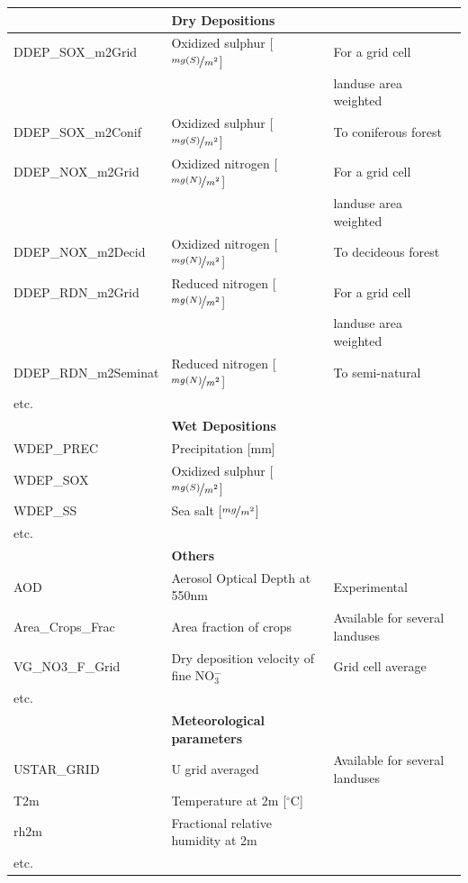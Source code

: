 \documentclass[a4paper,12pt]{report}
\newcommand{\degrees}{\ensuremath{^\circ}}
\newcommand{\tmgSm}{$\nicefrac{mg(S)}{m^{2}}$}
\newcommand{\tmgNm}{$\nicefrac{mg(N)}{m^{2}}$}
\newcommand{\tmgm}{$\nicefrac{mg}{m^{2}}$}
\begin{document}
\begin{center}
\begin{longtable}{lll}
& {\bf Dry Depositions}   & \\
\hline
    DDEP\_SOX\_m2Grid & Oxidized sulphur [\tmgSm]& For a grid cell\\
    & & landuse area weighted \\
    DDEP\_SOX\_m2Conif & Oxidized sulphur [\tmgSm]& To coniferous
    forest \\
    DDEP\_NOX\_m2Grid & Oxidized nitrogen [\tmgNm]& For a grid cell\\
    & & landuse area weighted \\
    DDEP\_NOX\_m2Decid & Oxidized nitrogen [\tmgNm]& To decideous
    forest \\
    DDEP\_RDN\_m2Grid & Reduced nitrogen [\tmgNm]& For a grid cell\\
    & & landuse area weighted \\
    DDEP\_RDN\_m2Seminat & Reduced nitrogen [\tmgNm]& To semi-natural \\
etc.& &\\ \hline
& {\bf Wet Depositions}   & \\
\hline
    WDEP\_PREC & Precipitation [mm]& \\
    WDEP\_SOX & Oxidized sulphur [\tmgSm]& \\
    WDEP\_SS  & Sea salt [\tmgm]& \\
etc.& &\\ \hline
& {\bf Others}   & \\
\hline
    AOD & Aerosol Optical Depth at 550nm & Experimental\\
    Area\_Crops\_Frac & Area fraction of crops & Available for several
    landuses\\
    VG\_NO3\_F\_Grid  & Dry deposition velocity of fine NO$_{3}^{-}$ &
    Grid cell average\\
etc.& &\\ \hline

& {\bf Meteorological parameters}   & \\
\hline
    USTAR\_GRID & U\* grid averaged & Available for several
    landuses\\
    T2m & Temperature at 2m [\degrees C] & \\
    rh2m  & Fractional relative humidity at 2m & \\
etc.& &\\ \hline
 

\end{longtable}
\end{center}
\end{document}

